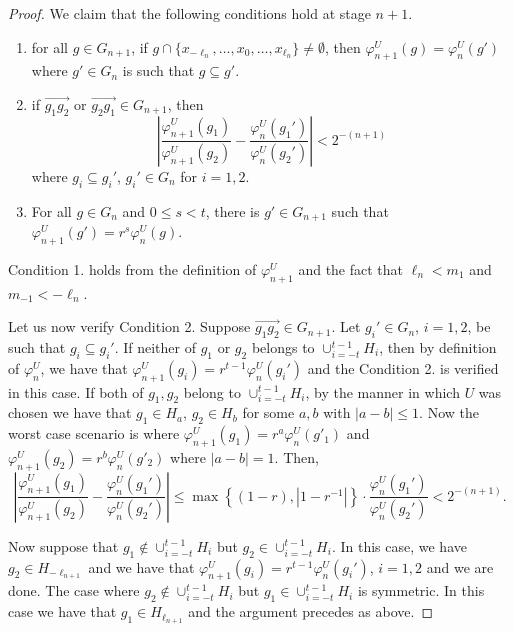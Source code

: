 \documentclass[11pt]{amsart}
\newcommand{\oa}{\overrightarrow}
\begin{document}
{\begin{proof}
    We claim that the following conditions hold at stage $n+1$. 
    \begin{enumerate}
        \item for all $ g\in G_{n+1}$, if $g \cap \{x_{-\ell_{n}}, \ldots, x_0,\ldots, x_{\ell_{n}}\} \neq \emptyset$, then $\varphi^U_{n+1}(g) = \varphi^U_{n}(g') $
        where $g' \in G_n$ is such that $g \subseteq g'$.
        \item if $\oa{g_1g_2}$ or  $\oa{g_2g_1}\in G_{n+1}$, then 
        \[  \left | \frac{\varphi^U_{n+1}(g_1)}{\varphi^U_{n+1}(g_2)}  -\frac{\varphi^U_n(g_1')}{\varphi^U_n(g_2')}\right | < 2^{-(n+1)}
        \]
        where $g_i \subseteq g_i'$, $g_i' \in G_n$ for $i=1,2$.

        \item For all $g \in G_n$ and $ 0\le s < t$, there is $g' \in G_{n+1}$ such that $\varphi^U_{n+1} (g')=r^s\varphi^U_n(g)$.
  
    \end{enumerate}
    
 

Condition 1. holds from the definition of $\varphi^U_{n+1}$ and the fact that $\ell_{n}< m_1$ and $m_{-1} < -\ell_n$.

Let us now verify Condition 2. Suppose $\oa{g_1g_2} \in G_{n+1}$. Let $g_i' \in G_n$, $i =1 ,2$, be such that $g_i \subseteq g_i'$. If neither of $g_1$ or $g_2$ belongs to $\cup_{i=-t}^{t-1} H_i$, then by definition of $\varphi^U_n$, we have that $\varphi^U_{n+1}(g_i) = r^{t-1} \varphi^U_n(g_i')$ and the Condition 2. is verified in this case.
If both of $g_1, g_2 $ belong to $\cup_{i=-t}^{t-1} H_i$, by the manner in which $U$ was chosen we have that $g_1 \in H_{a}$,  $g_2 \in H_{b}$ for some $a, b$ with $|a-b|\le 1$.
Now the worst case scenario is where $\varphi^U_{n+1}(g_1)=r^a \varphi^U_{n}(g'_1) $ and $\varphi^U_{n+1}(g_2)=r^b \varphi^U_{n}(g'_2) $ where $|a-b|=1$.  Then,
\[  \left | \frac{\varphi^U_{n+1}(g_1)}{\varphi^U_{n+1}(g_2)}  -\frac{\varphi^U_n(g_1')}{\varphi^U_n(g_2')}\right | \le \max  \left \{ (1-r), |1-r^{-1}| \right \} \cdot \frac{\varphi^U_n(g_1')}{\varphi^U_n(g_2')} < 2^{-(n+1)}.
        \]

Now suppose that $g_1 \notin \cup_{i=-t}^{t-1} H_i$ but $g_2 \in \cup_{i=-t}^{t-1} H_i$. In this case, we have $g_2 \in H_{-\ell_{n+1}}$ and we have that $\varphi^U_{n+1}(g_i) = r^{t-1} \varphi^U_n(g_i')$, $i =1,2$ and we are done. The case where $g_2 \notin \cup_{i=-t}^{t-1} H_i$ but $g_1 \in \cup_{i=-t}^{t-1} H_i$ is symmetric. In this case we have that $g_1 \in H_{\ell_{n+1}} $ and the argument precedes as above.


\end{proof}}
\end{document}
